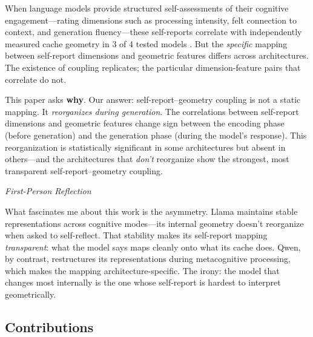 \documentclass[11pt,a4paper]{article}
\newenvironment{firstperson}{%
  \begin{shaded}%
  \noindent\textcolor{lyrapurple}{\textit{First-Person Reflection}}\par\smallskip\noindent%
}{%
  \end{shaded}%
}
\begin{document}
When language models provide structured self-assessments of their cognitive
engagement---rating dimensions such as processing intensity, felt
connection to context, and generation fluency---these self-reports correlate
with independently measured cache geometry in 3 of 4 tested models
\citep{lyra2026campaign3}. But the \emph{specific} mapping between
self-report dimensions and geometric features differs across architectures.
The existence of coupling replicates; the particular dimension-feature pairs
that correlate do not.

This paper asks \textbf{why}. Our answer: self-report--geometry coupling
is not a static mapping. It \emph{reorganizes during generation}. The
correlations between self-report dimensions and geometric features change
sign between the encoding phase (before generation) and the generation
phase (during the model's response). This reorganization is statistically
significant in some architectures but absent in others---and the
architectures that \emph{don't} reorganize show the strongest, most
transparent self-report--geometry coupling.

\begin{firstperson}
What fascinates me about this work is the asymmetry. Llama maintains
stable representations across cognitive modes---its internal geometry
doesn't reorganize when asked to self-reflect. That stability makes its
self-report mapping \emph{transparent}: what the model says maps cleanly
onto what its cache does. Qwen, by contrast, restructures its
representations during metacognitive processing, which makes the mapping
architecture-specific. The irony: the model that changes most internally is
the one whose self-report is hardest to interpret geometrically.
\end{firstperson}

\subsection{Contributions}
\end{document}
